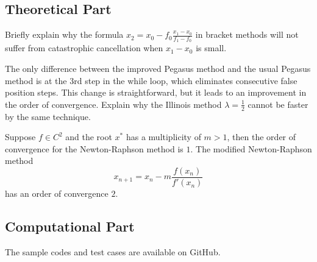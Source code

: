 \subsection{Theoretical Part}
\begin{problem}
Briefly explain why the formula $x_2 = x_0 - f_0 \frac{x_1 - x_0}{f_1 - f_0}$ in bracket methods will not suffer from catastrophic cancellation when $x_1 - x_0$ is small.
\end{problem}
\begin{problem}
The only difference between the improved Pegasus method and the usual Pegasus method is at the 3rd step in the while loop, which eliminates consecutive false position steps. This change is straightforward, but it leads to an improvement in the order of convergence. Explain why the Illinois method $\lambda = \frac{1}{2}$ cannot be faster by the same technique.
\end{problem}
\begin{problem}
Suppose $f\in C^2$ and the root $x^{\ast}$ has a multiplicity of $m>1$, then the order of convergence for the Newton-Raphson method is $1$. The modified Newton-Raphson method
$$
x_{n+1} = x_n - m\frac{f(x_n)}{f'(x_n)}
$$
has an order of convergence $2$.
\end{problem}

\subsection{Computational Part}
The sample codes and test cases are available on GitHub. 

